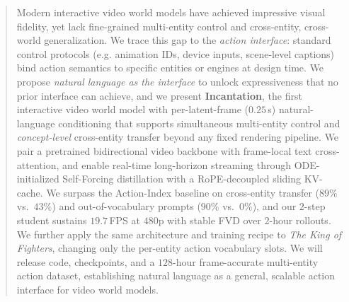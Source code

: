 \documentclass{article}
\theoremstyle{plain}
\theoremstyle{definition}
\theoremstyle{remark}
\newcommand{\methodname}{\textbf{Incantation}\xspace}
\begin{document}
\begin{abstract}
    Modern interactive video world models have achieved impressive 
    visual fidelity, yet lack fine-grained multi-entity control 
    and cross-entity, cross-world generalization. 
    We trace this gap to the \emph{action interface}:
    standard control protocols
    (e.g. animation IDs, device inputs, scene-level captions) 
    bind action semantics to specific entities or engines 
    at design time. 
    We propose \textit{natural language as the interface} to unlock 
    expressiveness that 
    no prior interface can achieve, and we present \methodname, 
    the first interactive video world model with per-latent-frame 
    ($0.25$\,s) natural-language conditioning that supports 
    simultaneous multi-entity control and \emph{concept-level} 
    cross-entity transfer beyond any fixed rendering pipeline. 
    We pair a pretrained bidirectional video backbone with 
    frame-local text cross-attention, and enable real-time 
    long-horizon streaming through ODE-initialized Self-Forcing 
    distillation with a RoPE-decoupled sliding KV-cache. 
    We surpass the Action-Index baseline on cross-entity transfer 
    ($89\%$ vs.\ $43\%$) and out-of-vocabulary prompts 
    ($90\%$ vs.\ $0\%$), and our $2$-step student sustains 
    $19.7$\,FPS at $480$p with stable FVD over 
    $2$-hour rollouts. 
    We further apply the same architecture and training recipe to
    \textit{The King of Fighters}, changing only the per-entity action vocabulary slots. 
    We will release code, checkpoints, and a $128$-hour frame-accurate multi-entity action dataset, establishing 
    natural language as a general, scalable action interface 
    for video world models.
\end{abstract}
\end{document}
